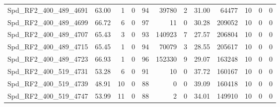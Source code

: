 \begin{longtable}[c]{@{}lrrrrrrrrrrr@{}}
Spd\_RF2\_400\_489\_4691      & 63.00                  & 1                       & 0                       & 94                     & 39780                   & 2                       & 31.00                   & 64477                    & 10                       & 0                        & 0                        \\
Spd\_RF2\_400\_489\_4699      & 66.72                  & 6                       & 0                       & 97                     & 11                      & 0                       & 30.28                   & 209052                   & 10                       & 0                        & 0                        \\
Spd\_RF2\_400\_489\_4707      & 65.43                  & 3                       & 0                       & 93                     & 140923                  & 7                       & 27.57                   & 206804                   & 10                       & 0                        & 0                        \\
Spd\_RF2\_400\_489\_4715      & 65.45                  & 1                       & 0                       & 94                     & 70079                   & 3                       & 28.55                   & 205617                   & 10                       & 0                        & 0                        \\
Spd\_RF2\_400\_489\_4723      & 66.93                  & 1                       & 0                       & 96                     & 152330                  & 9                       & 29.07                   & 163248                   & 10                       & 0                        & 0                        \\
Spd\_RF2\_400\_519\_4731      & 53.28                  & 6                       & 0                       & 91                     & 10                      & 0                       & 37.72                   & 160167                   & 10                       & 0                        & 0                        \\
Spd\_RF2\_400\_519\_4739      & 48.91                  & 10                      & 0                       & 88                     & 0                       & 0                       & 39.09                   & 160418                   & 10                       & 0                        & 0                        \\
Spd\_RF2\_400\_519\_4747      & 53.99                  & 11                      & 0                       & 88                     & 2                       & 0                       & 34.01                   & 149910                   & 10                       & 0                        & 0                        \\

\end{longtable}
